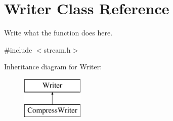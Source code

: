 \hypertarget{classWriter}{\section{Writer Class Reference}
\label{classWriter}
}


Write what the function does here.  




{\ttfamily \#include $<$stream.\+h$>$}

Inheritance diagram for Writer\+:\begin{figure}[H]
\begin{center}
\leavevmode
\includegraphics[height=2.000000cm]{classWriter}
\end{center}
\end{figure}
